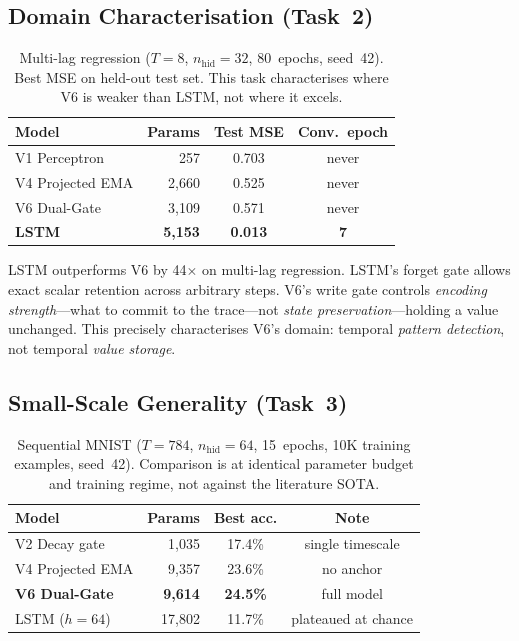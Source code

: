 \documentclass[11pt,a4paper]{article}
\begin{document}
\subsection{Domain Characterisation (Task~2)}

\begin{table}[t]
\centering
\caption{%
Multi-lag regression ($T=8$, $n_\mathrm{hid}=32$, 80~epochs, seed~42).
Best MSE on held-out test set.
This task characterises where V6 is weaker than LSTM, not where it excels.%
}
\label{tab:lag}
\begin{tabular}{@{}lrcc@{}}
\toprule
Model & Params & Test MSE & Conv.~epoch \\
\midrule
V1 Perceptron    & 257   & 0.703 & never \\
V4 Projected EMA & 2,660 & 0.525 & never \\
V6 Dual-Gate     & 3,109 & 0.571 & never \\
\textbf{LSTM}    & \textbf{5,153} & \textbf{0.013} & \textbf{7} \\
\bottomrule
\end{tabular}
\end{table}

LSTM outperforms V6 by 44$\times$ on multi-lag regression.
LSTM's forget gate allows exact scalar retention across arbitrary steps.
V6's write gate controls \emph{encoding strength}---what to commit to
the trace---not \emph{state preservation}---holding a value unchanged.
This precisely characterises V6's domain: temporal \emph{pattern detection},
not temporal \emph{value storage}.

\subsection{Small-Scale Generality (Task~3)}

\begin{table}[t]
\centering
\caption{%
Sequential MNIST ($T=784$, $n_\mathrm{hid}=64$, 15~epochs,
10K training examples, seed~42). Comparison is at identical
parameter budget and training regime, not against the literature SOTA.%
}
\label{tab:mnist}
\begin{tabular}{@{}lrcc@{}}
\toprule
Model & Params & Best acc. & Note \\
\midrule
V2 Decay gate         & 1,035  & 17.4\% & single timescale \\
V4 Projected EMA      & 9,357  & 23.6\% & no anchor \\
\textbf{V6 Dual-Gate} & \textbf{9,614} & \textbf{24.5\%} & full model \\
LSTM ($h=64$)         & 17,802 & 11.7\% & plateaued at chance \\
\bottomrule
\end{tabular}
\end{table}
\end{document}
